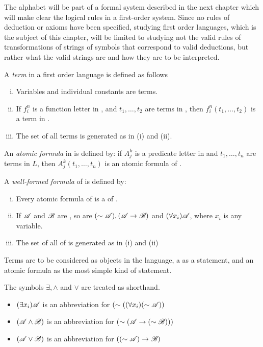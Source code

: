 The alphabet will be part of a formal system described in the next chapter which will make clear the logical rules in a first-order system. Since no rules of deduction or axioms have been specified, studying first order languages, which is the subject of this chapter, will be limited to studying not the valid rules of transformations of strings of symbols that correspond to valid deductions, but rather what the valid strings are and how they are to be interpreted.

\setcounter{definition}{5}
\begin{definition}
  A \textit{term} in a first order language \cl{} is defined as follows
  \begin{enumerate}[(i)]
    \item Variables and individual constants are terms.
    \item If \(f^n_i\) is a function letter in \cl{}, and \(t_1, \dots, t_2\) are terms in \cl{}, then \(f^n_i(t_1, \dots, t_2)\) is a term in \cl{}.
    \item The set of all terms is generated as in (i) and (ii).
  \end{enumerate}

  An \textit{atomic formula} in \cl{} is defined by: if \(A^k_j\) is a predicate letter in \cl{} and \(t_1, \dots, t_n\) are terms in \(L\), then \(A^k_j(t_1, \dots, t_n)\) is an atomic formula of \cl{}.

  A \textit{well-formed formula} of \cl{} is defined by:
  \begin{enumerate}[(i)]
    \item Every atomic formula of \cl{} is a \wf{} of \cl{}.
    \item If \(\mathscr{A}\) and \(\mathscr{B}\) are \wfs{}, so are \((\sim\mathscr{A}), (\mathscr{A} \rightarrow \mathscr{B})\) and \((\forall x_i)\mathscr{A}\), where \(x_i\) is any variable.
    \item The set of all \wfs{} of \cl{} is generated as in (i) and (ii)
  \end{enumerate}

  Terms are to be considered as objects in the language, a \wf{} as a statement, and an atomic formula as the most simple kind of statement.
\end{definition}

\medskip

The symbols \(\exists, \land\) and \(\lor\) are treated as shorthand.
\begin{itemize}
  \item \((\exists x_i) \mathscr{A}\) is an abbreviation for \((\sim((\forall x_i)(\sim\mathscr{A}))\)
  \item \((\mathscr{A} \land \mathscr{B})\) is an abbreviation for \((\sim(\mathscr{A} \rightarrow (\sim\mathscr{B})))\)
  \item \((\mathscr{A} \lor \mathscr{B})\) is an abbreviation for \(((\sim\mathscr{A}) \rightarrow \mathscr{B})\)
\end{itemize}

